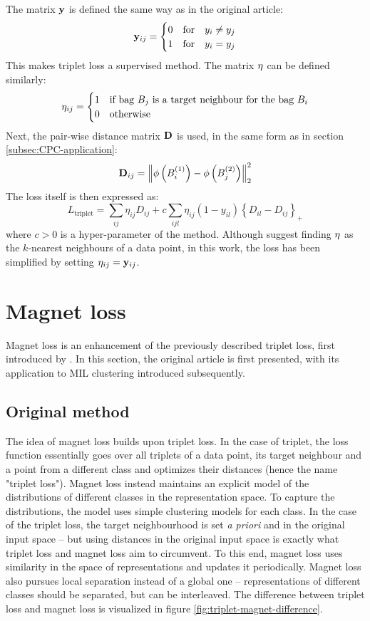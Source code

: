 The matrix \( \mathbf{y} \) is defined the same way as in the original article:
\[ \mathbf{y}_{ij} = \begin{cases}
    0 &\text{for} \quad y_i \neq y_j \\
    1 &\text{for} \quad y_i = y_j \\
  \end{cases} \]
This makes triplet loss a supervised method. The matrix \( \mathbf{\eta} \) can be defined similarly:
\[ \mathbf{\eta}_{ij} = \begin{cases}
    1 &\text{if bag } B_j \text{ is a target neighbour for the bag } B_i \\
    0 &\text{otherwise}
  \end{cases} \]
Next, the pair-wise distance matrix \( \mathbf{D} \) is used, in the same form as in section \ref{subsec:CPC-application}:
\[ \mathbf{D}_{ij} = \left\lVert \phi \left( B_i^{(1)} \right) - \phi \left( B_j^{(2)} \right) \right\rVert_2^2 \]
The loss itself is then expressed as:
\[ L_\mathrm{triplet} = \sum_{ij} \eta_{ij} D_{ij} + c \sum_{ijl} \eta_{ij} \left( 1 - y_{il} \right) \left\{ D_{il} - D_{ij} \right\}_+ \]
where \( c > 0 \) is a hyper-parameter of the method. Although \cite{weinberger_distance_2006} suggest finding \( \mathbf{\eta} \) as the \( k \)-nearest neighbours of a data point, in this work, the loss has been simplified by setting \( \mathbf{\eta}_{ij} = \mathbf{y}_{ij} \).

\section{Magnet loss}
Magnet loss is an enhancement of the previously described triplet loss, first introduced by \cite{rippel_metric_2015}. In this section, the original article is first presented, with its application to MIL clustering introduced subsequently.

\subsection{Original method}
The idea of magnet loss builds upon triplet loss. In the case of triplet, the loss function essentially goes over all triplets of a data point, its target neighbour and a point from a different class and optimizes their distances (hence the name "triplet loss"). Magnet loss instead maintains an explicit model of the distributions of different classes in the representation space. To capture the distributions, the model uses simple clustering models for each class. In the case of the triplet loss, the target neighbourhood is set \textit{a priori} and in the original input space -- but using distances in the original input space is exactly what triplet loss and magnet loss aim to circumvent. To this end, magnet loss uses similarity in the space of representations and updates it periodically. Magnet loss also pursues local separation instead of a global one -- representations of different classes should be separated, but can be interleaved. The difference between triplet loss and magnet loss is visualized in figure \ref{fig:triplet-magnet-difference}.

